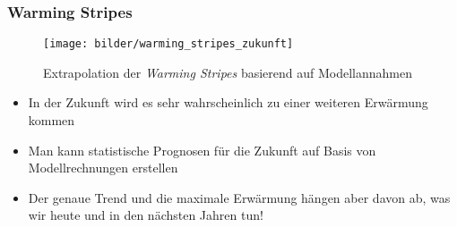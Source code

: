 \begin{frame}
	\frametitle{Warming Stripes}
	\begin{figure}
		\centering
		\texttt{[image: bilder/warming\_stripes\_zukunft]}
		\caption{Extrapolation der \textit{Warming Stripes} basierend auf Modellannahmen}
	\end{figure}
	\begin{itemize}
		\item In der Zukunft wird es sehr wahrscheinlich zu einer weiteren Erwärmung kommen
		\item Man kann statistische Prognosen für die Zukunft auf Basis von Modellrechnungen erstellen
		\item Der genaue Trend und die maximale Erwärmung hängen aber davon ab, was wir heute und in den nächsten Jahren tun!
	\end{itemize}

\end{frame}
